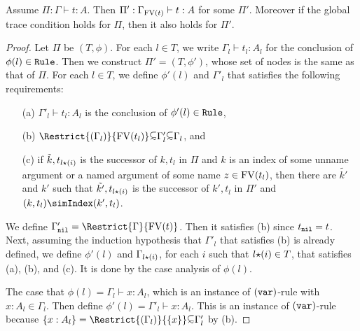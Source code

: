 \begin{lemma}
  Assume $\Pi:\Gamma\vdash t:A$.
  Then $\Pi':\Gamma_{{{\rm FV}}(t)}\vdash t:A$ for some $\Pi'$.
  Moreover if the global trace condition holds for $\Pi$, then it also holds for $\Pi'$. 
\end{lemma}
\begin{proof}
  Let $\Pi$ be $(T,\phi)$.
  For each $l \in T$, we write $\Gamma_l\vdash t_l:A_l$
  for the conclusion of $\phi(l) \in {\tt Rule}$. 
  Then we construct $\Pi'=(T,\phi')$,
  whose set of nodes is the same as that of $\Pi$. 
  For each $l\in T$, we define $\phi'(l)$ and $\Gamma'_l$ that satisfies
  the following requirements:
  \begin{itemize}
  \item[(a)]
    $\Gamma'_l\vdash t_l:A_l$ is the conclusion of $\phi'(l) \in {\tt Rule}$,
  \item[(b)]
    $\Restrict{(\Gamma_l)}{\FV(t_l)} \subseteqsim \Gamma'_l \subseteqsim \Gamma_l$, and
  \item[(c)]
    if $\tilde{k},t_{l{\star}(i)}$ is the successor of $k,t_l$ in $\Pi$
    and $k$ is an index of some unname argument
    or a named argument of some name $z\in{{\rm FV}}(t_l)$, 
    then there are $\tilde{k'}$ and $k'$ such that
    $\tilde{k'},t_{l{\star}(i)}$ is the successor of $k',t_l$ in $\Pi'$
    and $(k,t_l) \simIndex (k',t_l)$. 
  \end{itemize}
  We define $\Gamma'_{\nil} = \Restrict{\Gamma}{\FV(t)}$.
  Then it satisfies (b) since $t_{\tt nil} = t$. 
  Next, assuming the induction hypothesis that $\Gamma'_l$ that satisfies (b)
  is already defined, 
  we define $\phi'(l)$ and $\Gamma_{l{\star}(i)}$, 
  for each $i$ such that $l{\star}(i)\in T$, 
  that satisfies (a), (b), and (c). 
  It is done by the case analysis of $\phi(l)$.

  The case that $\phi(l) = \Gamma_l\vdash x:A_l$,
  which is an instance of $({\tt var})$-rule with $x:A_l\in\Gamma_l$. 
  Then define $\phi'(l) = \Gamma'_l\vdash x:A_l$. This is an instance of $({\tt var})$-rule
  because $\{x:A_l\} = \Restrict{(\Gamma_l)}{\{x\}} \subseteqsim \Gamma'_l$ by (b).


\end{proof}
